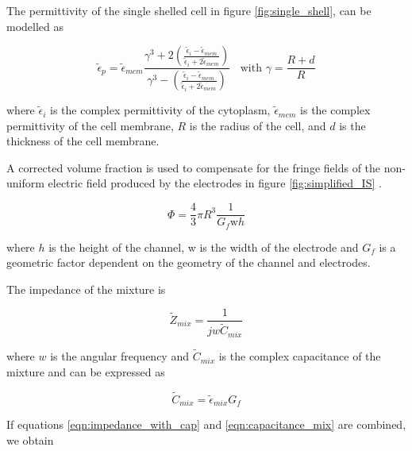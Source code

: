   \par The permittivity of the single shelled cell in figure \ref{fig:single_shell}, can be modelled as
  
  \begin{equation}
      \tilde{\epsilon}_p = \tilde{\epsilon}_{mem} 
      \frac{\gamma^3+2(\frac{\tilde{\epsilon}_i - \tilde{\epsilon}_{mem}}
      {\tilde{\epsilon}_i + 2\tilde{\epsilon}_{mem}})}{\gamma^3 - (\frac{\tilde{\epsilon}_i - \tilde{\epsilon}_{mem}}{\tilde{\epsilon}_i + 2\tilde{\epsilon}_{mem}})} \;\;\text{  with } 
      \gamma = \frac{R + d}{R} 
  \end{equation}
  
  \noindent where $\tilde{\epsilon}_i$ is the complex permittivity of the cytoplasm, $\tilde{\epsilon}_{mem}$ is the complex permittivity of the cell membrane, $R$ is the radius of the cell, and $d$ is the thickness of the cell membrane.
  
  \par A corrected volume fraction is used to compensate for the fringe fields of the non-uniform electric field produced by the electrodes in figure \ref{fig:simplified_IS} \cite{gawad_micromachined_2001}. 
  
  \begin{equation}
      \Phi = \frac{4}{3} \pi R^3 \frac{1}{G_f\text{w}h}
      \label{eqn:corrected_vf}
  \end{equation}
  
  \noindent where $h$ is the height of the channel, w is the width of the electrode and $G_f$ is a geometric factor dependent on the geometry of the channel and electrodes.
  
  The impedance of the mixture is
  
  \begin{equation}
    \tilde{Z}_{mix} = \frac{1}{jw\tilde{C}_{mix}}
    \label{eqn:impedance_with_cap}
  \end{equation}
  
  \noindent where $w$ is the angular frequency and $\tilde{C}_{mix}$ is the complex capacitance of the mixture and can be expressed as
  
  \begin{equation}
      \tilde{C}_{mix} = \tilde{\epsilon}_{mix} G_f
      \label{eqn:capacitance_mix}
  \end{equation}
  
  \noindent If equations \ref{eqn:impedance_with_cap} and \ref{eqn:capacitance_mix} are combined, we obtain
  
